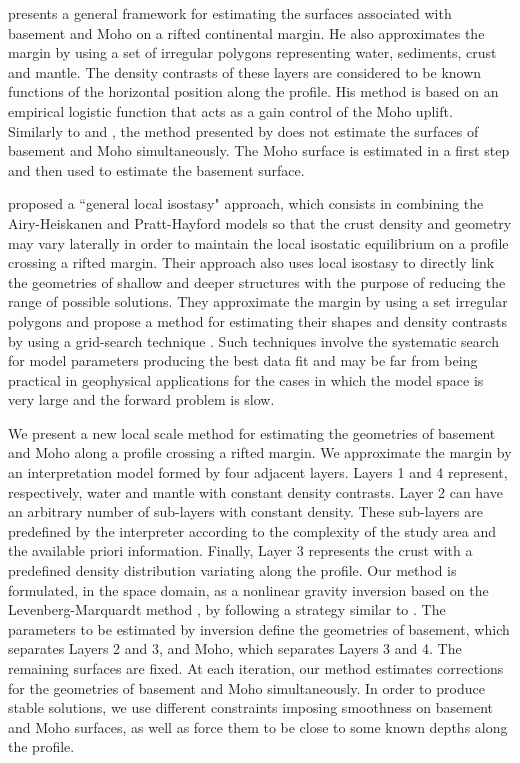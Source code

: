 \documentclass[manuscript]{geophysics}
\begin{document}
\citet{salem2017} presents a general framework for estimating the surfaces associated with
basement and Moho on a rifted continental margin.
He also approximates the margin by using a set of irregular polygons
representing water, sediments, crust and mantle.
The density contrasts of these layers are considered to be known functions
of the horizontal position along the profile.
His method is based on an empirical logistic function that acts as a gain control of the 
Moho uplift.
Similarly to \citet{salem-etal2014} and \citet{garcia-abdeslem2017}, the method presented
by \citet{salem2017} does not estimate the surfaces of basement and Moho simultaneously.
The Moho surface is estimated in a first step and then used to estimate the basement surface.

\citet{ferderer-etal2017} proposed a ``general local isostasy" approach, which consists
in combining the Airy-Heiskanen and Pratt-Hayford models \citep{heiskanen-moritz1967} 
so that the crust density and geometry 
may vary laterally in order to maintain the local isostatic equilibrium on a profile crossing
a rifted margin. Their approach also uses local isostasy to directly link the geometries
of shallow and deeper structures with the purpose of reducing the range of possible solutions.
They approximate the margin by using a set irregular polygons and propose a method 
for estimating their shapes and density contrasts by using a 
grid-search technique \citep{sen-stoffa2013}.
Such techniques involve the systematic search for model parameters producing the best data fit
and may be far from being practical in geophysical applications for the cases in which
the model space is very large and the forward problem is slow.

We present a new local scale method for estimating the geometries
of basement and Moho along a profile crossing a rifted margin.
We approximate the margin by an interpretation model formed by four adjacent layers.
Layers 1 and 4 represent, respectively, water and mantle with constant density contrasts.
Layer 2 can have an arbitrary number of sub-layers with constant density.
These sub-layers are predefined by the interpreter according to
the complexity of the study area and the available priori information.
Finally, Layer 3 represents the crust with a predefined density distribution
variating along the profile.
Our method is formulated, in the space domain, as a nonlinear gravity inversion
based on the Levenberg-Marquardt method \citep{silva-etal2001, aster-etal2005}, 
by following a strategy similar to \citet{barbosa-etal1999}.
The parameters to be estimated by inversion define the geometries of 
basement, which separates Layers 2 and 3, and Moho, which separates Layers 3 and 4.
The remaining surfaces are fixed.
At each iteration, our method estimates corrections for the geometries of
basement and Moho simultaneously. 
In order to produce stable solutions,
we use different constraints imposing smoothness on basement and Moho surfaces, 
as well as force them to be close to some known depths along the profile. 
\end{document}
